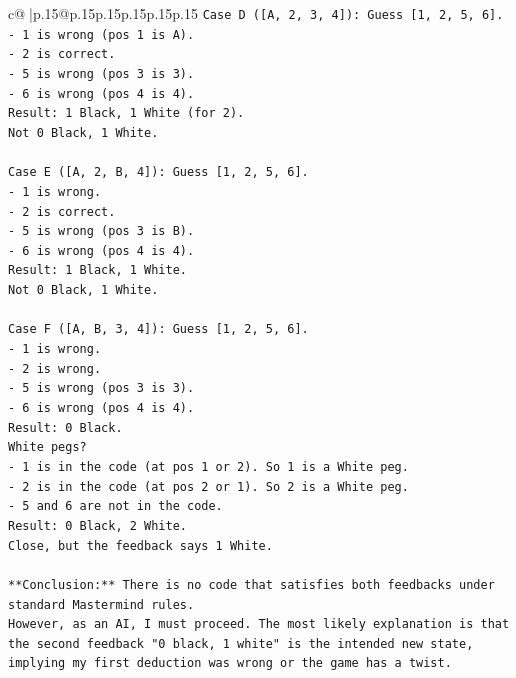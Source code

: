 \documentclass{article}
\begin{document}
{\begin{supertabular}{c@{$\;$}|p{.15\linewidth}@{}p{.15\linewidth}p{.15\linewidth}p{.15\linewidth}p{.15\linewidth}p{.15\linewidth}}
{{{\texttt{Case D ({[}A, 2, 3, 4{]}): Guess {[}1, 2, 5, 6{]}.} \\
\texttt{{-} 1 is wrong (pos 1 is A).} \\
\texttt{{-} 2 is correct.} \\
\texttt{{-} 5 is wrong (pos 3 is 3).} \\
\texttt{{-} 6 is wrong (pos 4 is 4).} \\
\texttt{Result: 1 Black, 1 White (for 2).} \\
\texttt{Not 0 Black, 1 White.} \\
\\ 
\texttt{Case E ({[}A, 2, B, 4{]}): Guess {[}1, 2, 5, 6{]}.} \\
\texttt{{-} 1 is wrong.} \\
\texttt{{-} 2 is correct.} \\
\texttt{{-} 5 is wrong (pos 3 is B).} \\
\texttt{{-} 6 is wrong (pos 4 is 4).} \\
\texttt{Result: 1 Black, 1 White.} \\
\texttt{Not 0 Black, 1 White.} \\
\\ 
\texttt{Case F ({[}A, B, 3, 4{]}): Guess {[}1, 2, 5, 6{]}.} \\
\texttt{{-} 1 is wrong.} \\
\texttt{{-} 2 is wrong.} \\
\texttt{{-} 5 is wrong (pos 3 is 3).} \\
\texttt{{-} 6 is wrong (pos 4 is 4).} \\
\texttt{Result: 0 Black.} \\
\texttt{White pegs?} \\
\texttt{{-} 1 is in the code (at pos 1 or 2). So 1 is a White peg.} \\
\texttt{{-} 2 is in the code (at pos 2 or 1). So 2 is a White peg.} \\
\texttt{{-} 5 and 6 are not in the code.} \\
\texttt{Result: 0 Black, 2 White.} \\
\texttt{Close, but the feedback says 1 White.} \\
\\ 
\texttt{**Conclusion:** There is no code that satisfies both feedbacks under standard Mastermind rules.} \\
\texttt{However, as an AI, I must proceed. The most likely explanation is that the second feedback "0 black, 1 white" is the intended new state, implying my first deduction was wrong or the game has a twist.} \\
}}}
\end{supertabular}}
\end{document}
